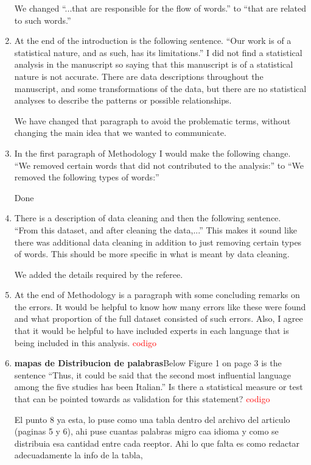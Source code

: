 \documentclass{article}
\begin{document}
\begin{enumerate}
We changed ``...that are responsible for the flow of words.'' to 
``that are related to such words.''

\item At the end of the introduction is the following sentence. “Our work
is of a statistical nature, and as such, has its limitations.” I did
not find a statistical analysis in the manuscript so saying that this
manuscript is of a statistical nature is not accurate. There are data
descriptions throughout the manuscript, and some transformations of
the data, but there are no statistical analyses to describe the
patterns or possible relationships.

We have changed that paragraph to avoid the problematic terms, without changing the main
idea that we wanted to communicate. 
\item In the first paragraph of Methodology I would make the following
change. “We removed certain words that did not contributed to the
analysis:” to “We removed the following types of words:”

Done
\item  There is a description of data cleaning and then the following
sentence. ``From this dataset, and after cleaning the data,...'' This
makes it sound like there was additional data cleaning in addition to
just removing certain types of words. This should be more specific in
what is meant by data cleaning.

We added the details required by the referee.
\item At the end of Methodology is a paragraph with some concluding %
remarks on the errors. It would be helpful to know how many errors
like these were found and what proportion of the full dataset
consisted of such errors. Also, I agree that it would be helpful to
have included experts in each language that is being included in this
analysis. \textcolor{red}{codigo}
\item \textbf{mapas de Distribucion de palabras}Below Figure 1 on page 3 is the sentence “Thus, it could be said 
that the second most influential language among the five studies has
been Italian.” Is there a statistical measure or test that can be
pointed towards as validation for this statement? \textcolor{red}{codigo}

El punto 8 ya esta, lo puse como una tabla dentro del archivo del articulo (paginas 5 y 6), ahi puse cuantas palabras migro caa idioma y como se distribuia esa cantidad entre cada reeptor. Ahi lo que falta es como redactar adecuadamente la info de la tabla,


\end{enumerate}
\end{document}
